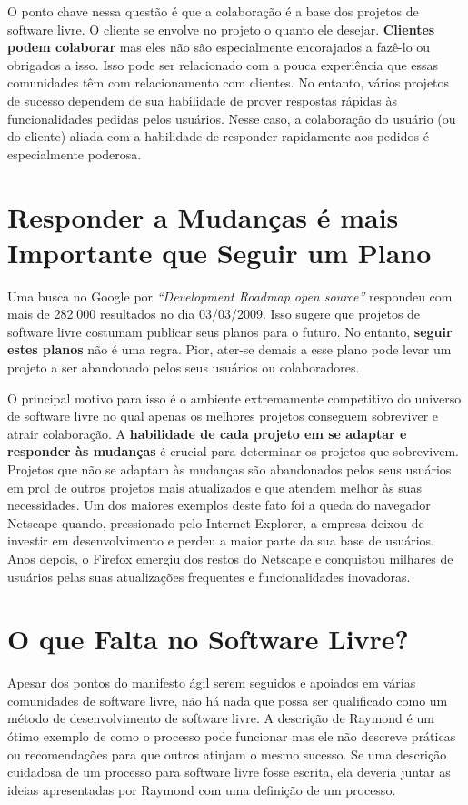 O ponto chave nessa questão é que a colaboração é a base dos projetos
de software livre.  O cliente se envolve no projeto o quanto ele
desejar. \textbf{Clientes podem colaborar} mas eles não são
especialmente encorajados a fazê-lo ou obrigados a isso. Isso pode ser
relacionado com a pouca experiência que essas comunidades têm com
relacionamento com clientes. No entanto, vários projetos de sucesso
dependem de sua habilidade de prover respostas rápidas às
funcionalidades pedidas pelos usuários. Nesse caso, a colaboração do
usuário (ou do cliente) aliada com a habilidade de responder
rapidamente aos pedidos é especialmente poderosa.

\section{Responder a Mudanças é mais Importante que Seguir um Plano}
\label{sec:fourth-princ}

Uma busca no Google por \emph{``Development Roadmap open source''}
respondeu com mais de 282.000 resultados no dia 03/03/2009. Isso
sugere que projetos de software livre costumam publicar seus planos
para o futuro. No entanto, \textbf{seguir estes planos} não é uma
regra. Pior, ater-se demais a esse plano pode levar um projeto a ser
abandonado pelos seus usuários ou colaboradores.

O principal motivo para isso é o ambiente extremamente competitivo do
universo de software livre no qual apenas os melhores projetos
conseguem sobreviver e atrair colaboração. A \textbf{habilidade de
  cada projeto em se adaptar e responder às mudanças} é crucial para
determinar os projetos que sobrevivem.  Projetos que não se adaptam às
mudanças são abandonados pelos seus usuários em prol de outros
projetos mais atualizados e que atendem melhor às suas necessidades.
Um dos maiores exemplos deste fato foi a queda do navegador Netscape
quando, pressionado pelo Internet Explorer, a empresa deixou de
investir em desenvolvimento e perdeu a maior parte da sua base de
usuários. Anos depois, o Firefox emergiu dos restos do Netscape e
conquistou milhares de usuários pelas suas atualizações frequentes e
funcionalidades inovadoras.

\section{O que Falta no Software Livre?}
\label{sec:os-summary}

Apesar dos pontos do manifesto ágil serem seguidos e apoiados em
várias comunidades de software livre, não há nada que possa ser
qualificado como um método de desenvolvimento de software livre. A
descrição de Raymond \cite{Raymond1999} é um ótimo exemplo de como o
processo pode funcionar mas ele não descreve práticas ou recomendações
para que outros atinjam o mesmo sucesso. Se uma descrição cuidadosa de
um processo para software livre fosse escrita, ela deveria juntar as
ideias apresentadas por Raymond com uma definição de um processo.

